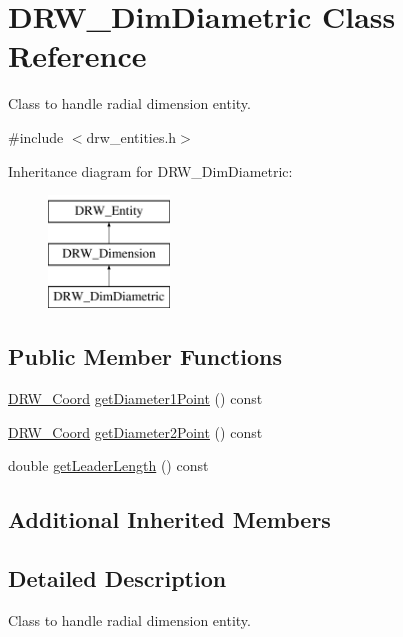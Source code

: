 \hypertarget{class_d_r_w___dim_diametric}{}\section{D\+R\+W\+\_\+\+Dim\+Diametric Class Reference}
\label{class_d_r_w___dim_diametric}


Class to handle radial dimension entity.  




{\ttfamily \#include $<$drw\+\_\+entities.\+h$>$}

Inheritance diagram for D\+R\+W\+\_\+\+Dim\+Diametric\+:\begin{figure}[H]
\begin{center}
\leavevmode
\includegraphics[height=3.000000cm]{d6/d19/class_d_r_w___dim_diametric}
\end{center}
\end{figure}
\subsection*{Public Member Functions}
\begin{DoxyCompactItemize}
\item 
\hyperlink{class_d_r_w___coord}{D\+R\+W\+\_\+\+Coord} \hyperlink{class_d_r_w___dim_diametric_accc66955a0cfcd75b11c68bebe310d3e}{get\+Diameter1\+Point} () const 
\item 
\hyperlink{class_d_r_w___coord}{D\+R\+W\+\_\+\+Coord} \hyperlink{class_d_r_w___dim_diametric_a9228e293ee74e3b70b32189c29de322c}{get\+Diameter2\+Point} () const 
\item 
double \hyperlink{class_d_r_w___dim_diametric_a1196c1df8bea7de9a9a89c158474cb48}{get\+Leader\+Length} () const 
\end{DoxyCompactItemize}
\subsection*{Additional Inherited Members}


\subsection{Detailed Description}
Class to handle radial dimension entity. 

